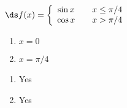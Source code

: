 {$\ds f(x) = \left\{\begin{array}{ccc}
\sin x		& &  x\leq \pi/4\\
\cos x & & x> \pi/4
\end{array}\right.
$
\begin{enumerate}
\item		$x=0$
\item		$x=\pi/4$
\end{enumerate}
}
{\begin{enumerate}
\item		Yes
\item		Yes
\end{enumerate}
}
